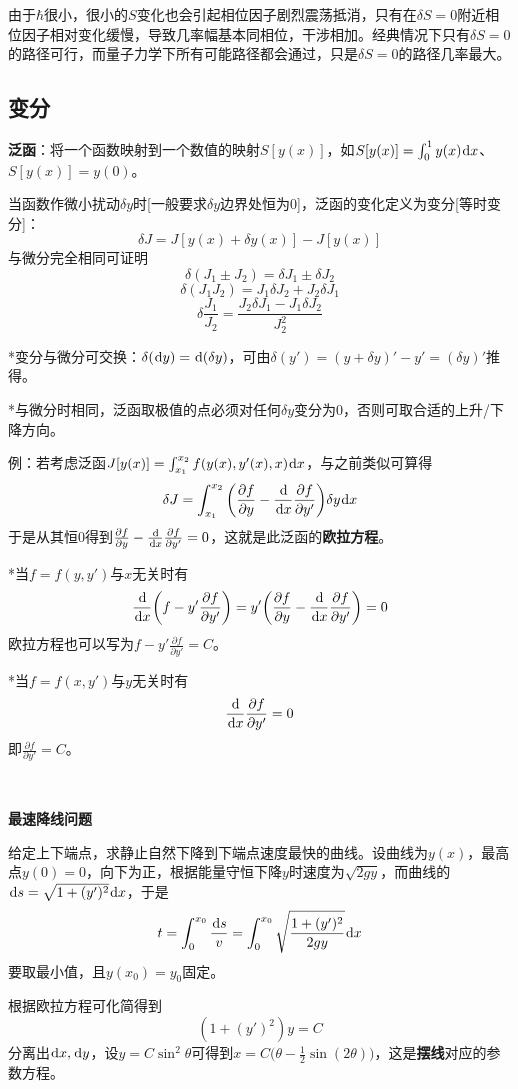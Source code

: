 \documentclass[a4paper,UTF8,fontset=windows]{ctexart}
\newcommand*{\dr}{\hspace{0.07em}\mathrm{d}}
\begin{document}
由于$\hbar$很小，很小的$S$变化也会引起相位因子剧烈震荡抵消，只有在$\delta S=0$附近相位因子相对变化缓慢，导致几率幅基本同相位，干涉相加。经典情况下只有$\delta S=0$的路径可行，而量子力学下所有可能路径都会通过，只是$\delta S=0$的路径几率最大。

\subsection{变分}
\textbf{泛函}：将一个函数映射到一个数值的映射$S[y(x)]$，如$S[y(x)]=\int_0^1y(x)\dr x$、$S[y(x)]=y(0)$。

当函数作微小扰动$\delta y$时[一般要求$\delta y$边界处恒为0]，泛函的变化定义为变分[等时变分]：
$$\delta J=J[y(x)+\delta y(x)]-J[y(x)]$$
与微分完全相同可证明
$$\delta(J_1\pm J_2)=\delta J_1\pm\delta J_2$$
$$\delta(J_1J_2)=J_1\delta J_2+J_2\delta J_1$$
$$\delta\frac{J_1}{J_2}=\frac{J_2\delta J_1-J_1\delta J_2}{J_2^2}$$

*变分与微分可交换：$\delta(\dr y)=\dr(\delta y)$，可由$\delta(y')=(y+\delta y)'-y'=(\delta y)'$推得。

*与微分时相同，泛函取极值的点必须对任何$\delta y$变分为0，否则可取合适的上升/下降方向。

例：若考虑泛函$J[y(x)]=\int_{x_1}^{x_2}f(y(x),y'(x),x)\dr x$，与之前类似可算得
$$\delta J=\int_{x_1}^{x_2}\bigg(\frac{\partial f}{\partial y}-\frac{\dr}{\dr x}\frac{\partial f}{\partial y'}\bigg)\delta y\dr x$$
于是从其恒0得到$\frac{\partial f}{\partial y}-\frac{\dr}{\dr x}\frac{\partial f}{\partial y'}=0$，这就是此泛函的\textbf{欧拉方程}。

*当$f=f(y,y')$与$x$无关时有
$$\frac{\dr}{\dr x}\bigg(f-y'\frac{\partial f}{\partial y'}\bigg)=y'\bigg(\frac{\partial f}{\partial y}-\frac{\dr}{\dr x}\frac{\partial f}{\partial y'}\bigg)=0$$
欧拉方程也可以写为$f-y'\frac{\partial f}{\partial y'}=C$。

*当$f=f(x,y')$与$y$无关时有
$$\frac{\dr}{\dr x}\frac{\partial f}{\partial y'}=0$$
即$\frac{\partial f}{\partial y'}=C$。

\

\textbf{最速降线问题}

给定上下端点，求静止自然下降到下端点速度最快的曲线。设曲线为$y(x)$，最高点$y(0)=0$，向下为正，根据能量守恒下降$y$时速度为$\sqrt{2gy}$，而曲线的$\dr s=\sqrt{1+(y')^2}\dr x$，于是
$$t=\int_0^{x_0}\frac{\dr s}{v}=\int_0^{x_0}\sqrt{\frac{1+(y')^2}{2gy}}\dr x$$
要取最小值，且$y(x_0)=y_0$固定。

根据欧拉方程可化简得到
$$(1+(y')^2)y=C$$
分离出$\dr x,\dr y$，设$y=C\sin^2\theta$可得到$x=C\big(\theta-\frac{1}{2}\sin(2\theta)\big)$，这是\textbf{摆线}对应的参数方程。
\end{document}
